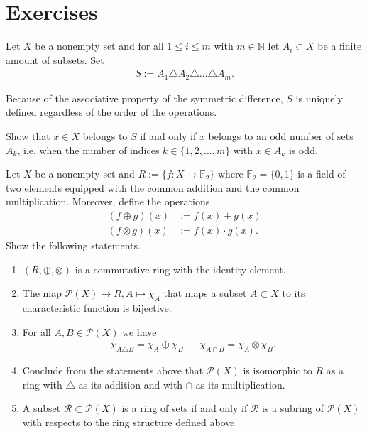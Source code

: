 \section{Exercises}
\begin{question}
    Let \(X\) be a nonempty set and for all \(1 \leq i \leq m\) with \(m \in \mathbb{N}\) let \(A_i \subset X\) be a finite amount of subsets. Set
    \begin{align}
        S := A_1 \triangle A_2 \triangle \dots \triangle A_m \text{.}
    \end{align}

    Because of the associative property of the symmetric difference, \(S\) is uniquely defined regardless of the order of the operations.

    Show that \(x \in X\) belongs to \(S\) if and only if \(x\) belongs to an odd number of sets \(A_k\), i.e. when the number of indices \(k \in \{1, 2, \dots, m\}\) with \(x \in A_k\) is odd.
\end{question}
\begin{solution}
\end{solution}
%
%
%
\begin{question}
    Let \(X\) be a nonempty set and \(R := \{f: X \rightarrow \mathbb{F}_2\}\) where \(\mathbb{F}_2 = \{0, 1\}\) is a field of two elements equipped with the common addition and the common multiplication. Moreover, define the operations
    \begin{align}
        (f \oplus g)(x) &:= f(x) + g(x) \\
        (f \otimes g)(x) &:= f(x) \cdot g(x) \text{.}
    \end{align}
    Show the following statements.
    \begin{enumerate}
        \item \((R, \oplus, \otimes)\) is a commutative ring with the identity element.
        \item The map \(\mathcal{P}(X) \rightarrow R, A \mapsto \chi_A\) that maps a subset \(A \subset X\) to its characteristic function is bijective.
        \item For all \(A, B \in \mathcal{P}(X)\) we have
        \begin{align}
            \chi_{A \triangle B} = \chi_A \oplus \chi_B && \chi_{A \cap B} = \chi_A \otimes \chi_B \text{.}
        \end{align}
        \item Conclude from the statements above that \(\mathcal{P}(X)\) is isomorphic to \(R\) as a ring with \(\triangle\) as its addition and with \(\cap\) as its multiplication.
        \item A subset \(\mathcal{R} \subset \mathcal{P}(X)\) is a ring of sets if and only if \(\mathcal{R}\) is a subring of \(\mathcal{P}(X)\) with respects to the ring structure defined above.
    \end{enumerate}
\end{question}
